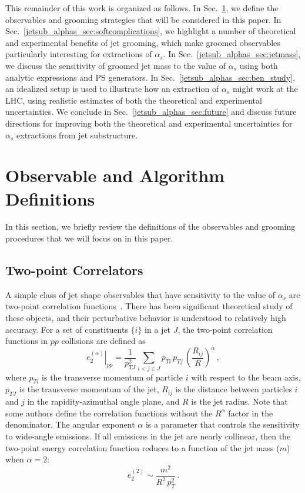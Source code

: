 \documentclass[11pt]{cernrep}
\begin{document}
This remainder of this work is organized as follows.
%
In Sec.~\ref{jetsub_alphas_sec:definitions}, we define the observables and grooming strategies that will be considered in this paper.
%
In Sec.~\ref{jetsub_alphas_sec:softcomplications}, we highlight a number of theoretical and experimental benefits of jet grooming, which make groomed observables particularly interesting for extractions of $\alpha_s$.
%
In Sec.~\ref{jetsub_alphas_sec:jetmass}, we discuss the sensitivity of groomed jet mass to the value of $\alpha_s$ using both analytic expressions and PS generators.
%
In Sec.~\ref{jetsub_alphas_sec:ben_study}, an idealized setup is used to illustrate how an extraction of $\alpha_s$ might work at the LHC, using realistic estimates of both the theoretical and experimental uncertainties.
%
We conclude in Sec.~\ref{jetsub_alphas_sec:future} and discuss future directions for improving both the theoretical and experimental uncertainties for $\alpha_s$ extractions from jet substructure.

\section{Observable and Algorithm Definitions}
\label{jetsub_alphas_sec:definitions}

In this section, we briefly review the definitions of the observables and grooming procedures that we will focus on in this paper.

\subsection{Two-point Correlators}\label{jetsub_alphas_sec:shape_def}

A simple class of jet shape observables that have sensitivity to the value of $\alpha_s$ are two-point correlation functions~\cite{Banfi:2004yd,Larkoski:2013eya}.
%
There has been significant theoretical study of these objects, and their perturbative behavior is understood to relatively high accuracy.
%
For a set of constituents $\{i\}$ in a jet $J$, the two-point correlation functions in $pp$ collisions are defined as
%
\begin{equation}
\label{jetsub_alphas_eq:ppe2}
\left.e_2^{(\alpha)}\right|_{pp}=\frac{1}{p_{TJ}^2}\sum_{i<j\in J} p_{Ti} \, p_{Tj} \, \left(\frac{R_{ij}}{R}\right)^\alpha\,, 
\end{equation}
where $p_{Ti}$ is the transverse momentum of particle $i$ with respect to the beam axis, $p_{TJ}$ is the transverse momentum of the jet, $R_{ij}$ is the distance between particles $i$ and $j$ in the rapidity-azimuthal angle plane, and $R$ is the jet radius.
%
Note that some authors define the correlation functions without the $R^\alpha$ factor in the denominator.
%
The angular exponent $\alpha$ is a parameter that controls the sensitivity to wide-angle emissions.
%
If all emissions in the jet are nearly collinear, then the two-point energy correlation function reduces to a function of the jet mass ($m$) when $\alpha=2$:
\begin{equation}
e_2^{(2)}\sim \frac{m^2}{R^2\, p_{T}^2}\,.
\end{equation} 
\end{document}
